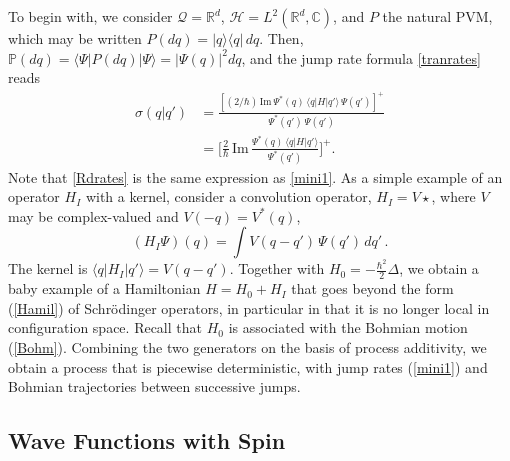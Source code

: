 \documentclass[12pt]{article}
\newcommand{\CCC}{\mathbb{C}} %
\newcommand{\RRR}{\mathbb{R}} %
\newcommand{\1}{\mathbf{1}} %
\newcommand{\Laplace}{\Delta} %
\renewcommand{\Im}{\mathrm{Im}} %
\newcommand{\Hilbert}{\mathscr{H}}
\renewcommand{\sp}[2]{\langle #1 | #2 \rangle} %
\newcommand{\conf}{\mathcal{Q}} %
\newcommand{\measure}{\mathbb{P}} %
\newcommand{\pov}{{P}}%
\newcommand{\inter}{{I}} %
\begin{document}
To begin with, we consider $\conf = \RRR^d$, $\Hilbert =
L^2(\RRR^d,\CCC)$, and $\pov$ the natural PVM, which may be written
$\pov(dq) = |q\rangle \langle q | \, dq$. Then, $\measure(dq) =
\sp{\Psi}{\pov(dq) | \Psi} = |\Psi(q)|^2 dq$, and the jump rate
formula \eqref{tranrates} reads
\begin{subequations}
\begin{align}
   \sigma(q|q') &= \frac{[(2/\hbar) \, \Im \, \Psi^*(q) \, \sp{q}{H|q'}
   \, \Psi(q')]^+}{\Psi^*(q') \, \Psi(q')} \label{Rdrates}\\
   &= \Big[ \frac{2}{\hbar} \, \Im \, \frac{ \Psi^*(q) \,
   \sp{q}{H|q'}}{\Psi^*(q')} \Big]^+ .
\end{align}
\end{subequations}
Note that \eqref{Rdrates} is the same expression as \eqref{mini1}.  As
a simple example of an operator $H_\inter$ with a kernel, consider a
convolution operator, $H_\inter = V \star$, where $V$ may be
complex-valued and  $V(-q) = V^*(q)$,
\[
   (H_\inter\Psi)(q)=\int V(q-q') \, \Psi(q') \, dq'\,.
\]
The kernel is $\sp{q}{H_\inter|q'} = V(q-q')$. Together with $H_0 =
-\frac{\hbar^2}{2} \Laplace$, we obtain a baby example of a
Hamiltonian $H = H_0 + H_\inter$ that goes beyond the form
(\ref{Hamil}) of Schr\"odinger operators, in particular in that it is
no longer local in configuration space. Recall that $H_0$ is
associated with the Bohmian motion (\ref{Bohm}). Combining the two
generators on the basis of process additivity, we obtain a process
that is piecewise deterministic, with jump rates (\ref{mini1}) and
Bohmian trajectories between successive jumps.


\subsection{Wave Functions with Spin}\label{sec:exspin}
\end{document}
